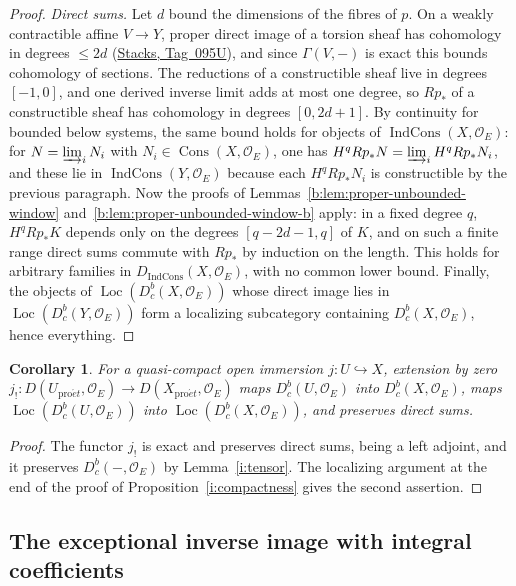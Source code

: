 \documentclass[11pt,a4paper]{article}
\numberwithin{equation}{section}
\newtheorem{corollary}[theorem]{Corollary}
\theoremstyle{definition}
\theoremstyle{remark}
\newcommand{\Dbc}{D^b_c}
\newcommand{\Loc}{\operatorname{Loc}}
\newcommand{\proet}{\mathrm{pro}\acute{e}t}
\newcommand{\stacks}[1]{\href{https://stacks.math.columbia.edu/tag/#1}{\textnormal{Stacks, Tag~#1}}}
\newcommand{\Cons}{\operatorname{Cons}}
\newcommand{\IndCons}{\operatorname{IndCons}}
\newcommand{\Dic}{D_{\IndCons}}
\begin{document}
\begin{proof}
\emph{Direct sums.} Let $d$ bound the dimensions of the fibres of $p$. On
a weakly contractible affine $V\to Y$, proper direct image of a torsion
sheaf has cohomology in degrees $\le 2d$ (\stacks{095U}), and since
$\Gamma(V,-)$ is exact this bounds cohomology of sections. The reductions
of a constructible sheaf live in degrees $[-1,0]$, and one derived
inverse limit adds at most one degree, so $Rp_*$ of a constructible
sheaf has cohomology in degrees $[0,2d+1]$. By continuity for bounded
below systems, the same bound holds for objects of
$\IndCons(X,\mathcal O_E)$: for $N=\varinjlim_iN_i$ with
$N_i\in\Cons(X,\mathcal O_E)$, one has
$H^qRp_*N=\varinjlim_iH^qRp_*N_i$, and these lie in
$\IndCons(Y,\mathcal O_E)$ because each $H^qRp_*N_i$ is constructible by
the previous paragraph. Now the proofs of
Lemmas~\ref{b:lem:proper-unbounded-window}
and~\ref{b:lem:proper-unbounded-window-b} apply: in a fixed degree $q$,
$H^qRp_*K$ depends only on the degrees $[q-2d-1,q]$ of $K$, and on such
a finite range direct sums commute with $Rp_*$ by induction on the
length. This holds for arbitrary families in $\Dic(X,\mathcal O_E)$,
with no common lower bound. Finally, the objects of
$\Loc(\Dbc(X,\mathcal O_E))$ whose direct image lies in
$\Loc(\Dbc(Y,\mathcal O_E))$ form a localizing subcategory containing
$\Dbc(X,\mathcal O_E)$, hence everything.
\end{proof}

\begin{corollary}\label{i:compactness-b}
For a quasi-compact open immersion $j:U\hookrightarrow X$, extension by
zero $j_!\colon D(U_{\proet},\mathcal O_E)\to D(X_{\proet},\mathcal O_E)$
maps $\Dbc(U,\mathcal O_E)$ into $\Dbc(X,\mathcal O_E)$, maps
$\Loc(\Dbc(U,\mathcal O_E))$ into $\Loc(\Dbc(X,\mathcal O_E))$, and
preserves direct sums.
\end{corollary}
\begin{proof}
The functor $j_!$ is exact and preserves direct sums, being a left
adjoint, and it preserves $\Dbc(-,\mathcal O_E)$ by Lemma~\ref{i:tensor}.
The localizing argument at the end of the proof of
Proposition~\ref{i:compactness} gives the second assertion.
\end{proof}

\subsection{The exceptional inverse image with integral coefficients}
\end{document}
